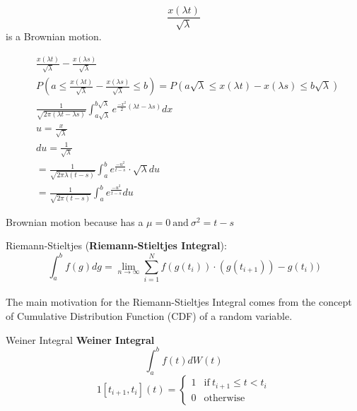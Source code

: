 \begin{frame}
$$ \frac{x(\lambda t)}{\sqrt{\lambda}}$$ is a Brownian motion. 

\begin{align*}
 & \frac{x(\lambda t)}{\sqrt{\lambda}}-\frac{x(\lambda s)}{\sqrt{\lambda}}\\
 & P \left(a \leq \frac{x(\lambda t)}{\sqrt{\lambda}}-\frac{x(\lambda s)}{\sqrt{\lambda}} \leq b \right)=P \left(a \sqrt{\lambda} \leq x(\lambda t) - x (\lambda s) \leq b \sqrt{\lambda} \right)\\
 & \displaystyle \frac{1}{\sqrt{2 \pi (\lambda t -\lambda s)}} \int_{a \sqrt{\lambda}}^{b \sqrt{\lambda}} e^{\frac{-x^2}{2}(\lambda t- \lambda s)} dx\\
  & u=\frac{x}{\sqrt{\lambda}}\\
  & du=\frac{1}{\sqrt{\lambda}}\\
  & =\frac{1}{\sqrt{2 \pi \lambda(t-s)}} \int_{a}^{b} e^{\frac{-u^2}{t-s}} \cdot \sqrt{\lambda}du\\
  & = \frac{1}{\sqrt{2 \pi (t-s)}} \int_{a}^{b} e^{\frac{-u^2}{t-s}}du
 \end{align*}
 

Brownian motion because has a $\mu=0 \ \text{and} \ \sigma^2=t-s$

\end{frame}

\begin{frame}{Riemann-Stieltjes}
(\textbf{Riemann-Stieltjes Integral}): 
$$\displaystyle \int_{a}^{b} f(g)dg= \underset{n \to \infty}{\lim} \sum_{i=1}^{N} f(g(t_i)) \cdot (g(t_{i+1}))- g(t_i))$$\\

The main motivation for the Riemann-Stieltjes Integral comes from the concept of Cumulative Distribution Function (CDF) of a random variable. 
\end{frame}

\begin{frame}{Weiner Integral}
\textbf{Weiner Integral} $$\int_{a}^{b} f(t)dW(t)$$
$$1[t_{i+1}, t_i] (t)= \begin{cases} 1 & \text{if} \ t_{i+1} \leq t < t_i \\
0 & \text{otherwise} \end{cases}$$
\end{frame}



